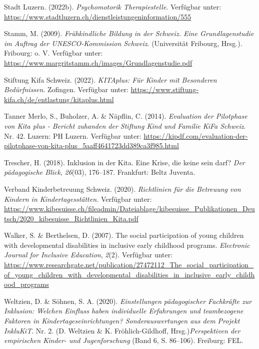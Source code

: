 \documentclass[
  ngerman,
  11pt,
  paper=a4,
  twoside,
  titlepage=true,
  openright,
  abstract=on,
  toc=listofnumbered,
  numbers=noenddot,
  chapterprefix=true,
  headings=optiontohead,
  svgnames,
  dvipsnames]{scrreprt}
\newlength{\cslhangindent}
\newlength{\cslentryspacingunit} %
\newenvironment{CSLReferences}[2] %
 {%
  \setlength{\parindent}{0pt}
  \ifodd #1
  \let\oldpar\par
  \def\par{\hangindent=\cslhangindent\oldpar}
  \fi
  \setlength{\parskip}{#2\cslentryspacingunit}
 }%
 {}
\begin{document}
\begin{CSLReferences}{1}{0}
\leavevmode{}%
Stadt Luzern. (2022b). \emph{Psychomotorik Therapiestelle}. Verfügbar
unter: \url{https://www.stadtluzern.ch/dienstleistungeninformation/555}

\leavevmode{}%
Stamm, M. (2009). \emph{Frühkindliche Bildung in der Schweiz. Eine
Grundlagenstudie im Auftrag der UNESCO-Kommission Schweiz}. (Universität
Fribourg, Hrsg.). Fribourg: o. V. Verfügbar unter:
\url{https://www.margritstamm.ch/images/Grundlagenstudie.pdf}

\leavevmode{}%
Stiftung Kifa Schweiz. (2022). \emph{KITAplus: Für Kinder mit Besonderen
Bedürfnissen}. Zofingen. Verfügbar unter:
\url{https://www.stiftung-kifa.ch/de/entlastung/kitaplus.html}

\leavevmode{}%
Tanner Merlo, S., Buholzer, A. \& Näpflin, C. (2014). \emph{Evaluation
der Pilotphase von Kita plus - Bericht zuhanden der Stiftung Kind und
Familie KiFa Schweiz}. Nr. 42. Luzern: PH Luzern. Verfügbar unter:
\url{https://kipdf.com/evaluation-der-pilotphase-von-kita-plus_5aaff4641723dd389ca3f985.html}

\leavevmode{}%
Trescher, H. (2018). Inklusion in der Kita. Eine Krise, die keine sein
darf? \emph{Der pädagogische Blick}, \emph{26}(03), 176–187. Frankfurt:
Beltz Juventa.

\leavevmode{}%
Verband Kinderbetreuung Schweiz. (2020). \emph{Richtlinien für die
Betreuung von Kindern in Kindertagesstätten.} Verfügbar unter:
\url{https://www.kibesuisse.ch/fileadmin/Dateiablage/kibesuisse_Publikationen_Deutsch/2020_kibesuisse_Richtlinien_Kita.pdf}

\leavevmode{}%
Walker, S. \& Berthelsen, D. (2007). The social participation of young
children with developmental disabilities in inclusive early childhood
programs. \emph{Electronic Journal for Inclusive Education},
\emph{2}(2). Verfügbar unter:
\url{https://www.researchgate.net/publication/27472112_The_social_participation_of_young_children_with_developmental_disabilities_in_inclusive_early_childhood_programs}

\leavevmode{}%
Weltzien, D. \& Söhnen, S. A. (2020). \emph{Einstellungen pädagogischer
Fachkräfte zur Inklusion: Welchen Einfluss haben individuelle
Erfahrungen und teambezogene Faktoren in Kindertageseinrichtungen?
Sonderauswertungen aus dem Projekt InkluKiT}. Nr. 2. (D. Weltzien \& K.
Fröhlich-Gildhoff, Hrsg.)\emph{Perspektiven der empirischen Kinder- und
Jugenforschung} (Band 6, S. 86–106). Freiburg: FEL.


\end{CSLReferences}
\end{document}

